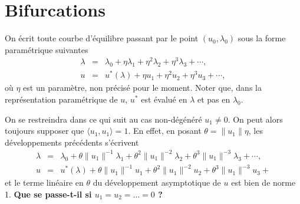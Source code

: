 \documentclass[12pt, final]{amsart}
\begin{document}
\section{Bifurcations}

On {\'e}crit toute courbe d'{\'e}quilibre passant par le point $(u_0,
\lambda_0)$ sous la forme param{\'e}trique suivantes
\begin{eqnarray}
  \lambda & = & \lambda_0 + \eta \lambda_1 + \eta^2 \lambda_2 + \eta^3
  \lambda_3 + \cdots,  \label{eq20211115075817}\\
  u & = & u^{\ast} (\lambda) + \eta u_1 + \eta^2 u_2 + \eta^3 u_3 + \cdots,
  \label{eq20211115075835}
\end{eqnarray}
o{\`u} $\eta$ est un param{\`e}tre, non pr{\'e}cis{\'e} pour le moment. Noter
que, dans la repr{\'e}sentation param{\'e}trique de $u$, $u^{\ast}$ est
{\'e}valu{\'e} en $\lambda$ et pas en $\lambda_0$.

On se restreindra dans ce qui suit au cas non-d{\'e}g{\'e}n{\'e}r{\'e} $u_1
\neq 0$. On peut alors toujours supposer que $\langle u_1, u_1 \rangle = 1$.
En effet, en posant $\theta = \lVert u_1 \rVert \eta$, les d{\'e}veloppements
pr{\'e}c{\'e}dents s'{\'e}crivent
\begin{eqnarray}
  \lambda & = & \lambda_0 + \theta \lVert u_1 \rVert^{- 1} \lambda_1 + \theta^2 \lVert u_1 \rVert^{- 2} \lambda_2 + \theta^3
  \lVert u_1 \rVert^{- 3} \lambda_3 + \cdots, \\
  u & = & u^{\ast} (\lambda) + \theta \lVert u_1 \rVert^{- 1} u_1 + \theta^2 \lVert u_1 \rVert^{- 2} u_2 + \theta^3 \lVert u_1
  \rVert^{- 3} u_3 +
\end{eqnarray}
et le terme lin{\'e}aire en $\theta$ du d{\'e}veloppement asymptotique de $u$
est bien de norme 1. \textbf{Que se passe-t-il si $u_1 = u_2 = \ldots = 0$
?}
\end{document}
